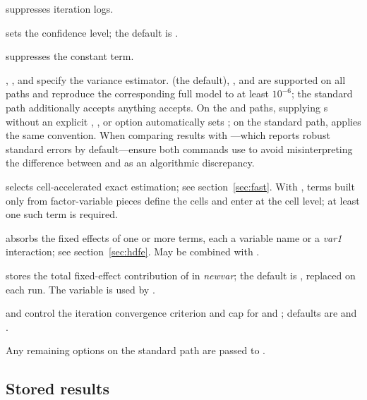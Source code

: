 \documentclass[12pt,a4paper]{article}
\begin{document}
\hangpara
{} suppresses iteration logs.

\hangpara
{} sets the confidence level; the default is
.

\hangpara
{} suppresses the constant term.

\hangpara
\sloppy
{}, , and
 specify the variance estimator.
 (the default), , and
 are supported on all paths
and reproduce the corresponding full  model to at least
$10^{-6}$; the standard path additionally accepts anything
 accepts.  On the  and 
paths, supplying s without an explicit ,
, or  option automatically sets
; on the standard path,  applies the
same convention.  When comparing results with ---which
reports robust standard errors by default---ensure both commands use
 to avoid misinterpreting the difference between
 and  as an algorithmic discrepancy.

\hangpara
{} selects cell-accelerated exact estimation; see
section~\ref{sec:fast}.  With , terms built only from
factor-variable pieces define the cells and enter at the cell level; at
least one such term is required.

\hangpara
{} absorbs the fixed effects of one or more
terms, each a variable name or a {\it var1\/}
interaction; see section~\ref{sec:hdfe}.  May be combined with
.

\hangpara
{} stores the total fixed-effect contribution
of  in {\it newvar\/}; the default is
, replaced on each run.  The variable is used by
.

\hangpara
{} and  control the iteration
convergence criterion and cap for  and ;
defaults are  and .

\medskip
\noindent
Any remaining options on the standard path are passed to
.

\subsection{Stored results}\label{stored-results}
\end{document}
